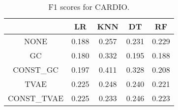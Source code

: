 \begin{table}
\caption{F1 scores for CARDIO.}
\label{tab:f1-CARDIO}
\begin{tabular}{ccccc}
\toprule
 & LR & KNN & DT & RF \\
\midrule
NONE & 0.188 & 0.257 & 0.231 & 0.229 \\
GC & 0.180 & 0.332 & 0.195 & 0.188 \\
CONST\_GC & 0.197 & 0.411 & 0.328 & 0.208 \\
TVAE & 0.225 & 0.248 & 0.240 & 0.221 \\
CONST\_TVAE & 0.225 & 0.233 & 0.246 & 0.223 \\
\bottomrule
\end{tabular}
\end{table}
